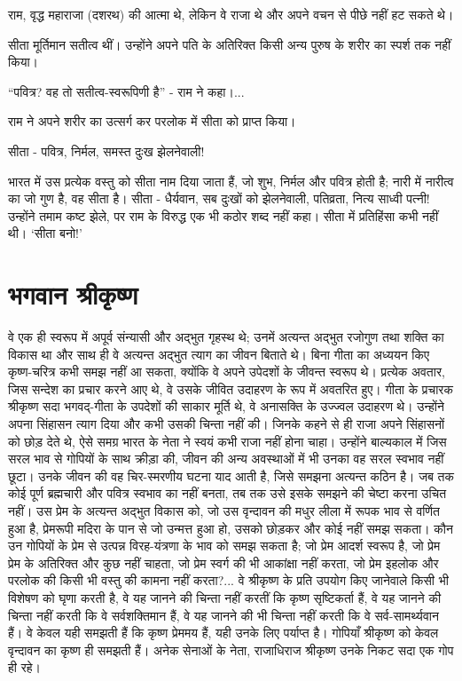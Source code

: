 राम, वृद्ध महाराजा (दशरथ) की आत्मा थे, लेकिन वे राजा थे और अपने वचन से पीछे नहीं हट सकते थे। 

सीता मूर्तिमान सतीत्व थीं। उन्होंने अपने पति के अतिरिक्त किसी अन्य पुरुष के शरीर का स्पर्श तक नहीं किया। 

\vskip 2pt

“पवित्र? वह तो सतीत्व-स्वरूपिणी है” - राम ने कहा।... 

\vskip 2pt

राम ने अपने शरीर का उत्सर्ग कर परलोक में सीता को प्राप्त किया। 

\vskip 2pt

सीता - पवित्र, निर्मल, समस्त दुःख झेलनेवाली! 

\vskip 2pt

भारत में उस प्रत्येक वस्तु को सीता नाम दिया जाता हैं, जो शुभ, निर्मल और पवित्र होती है; नारी में नारीत्व का जो गुण है, वह सीता है। सीता - धैर्यवान, सब दुःखों को झेलनेवाली, पतिव्रता, नित्य साध्वी पत्नी! उन्होंने तमाम कष्ट झेले, पर राम के विरुद्ध एक भी कठोर शब्द नहीं कहा। सीता में प्रतिहिंसा कभी नहीं थी। ‘सीता बनो!’ 

\vskip 2pt


\section*{भगवान श्रीकृष्ण}


वे एक ही स्वरूप में अपूर्व संन्यासी और अद्भुत गृहस्थ थे; उनमें अत्यन्त अद्भुत रजोगुण तथा शक्ति का विकास था और साथ ही वे अत्यन्त अद्भुत त्याग का जीवन बिताते थे। बिना गीता का अध्ययन किए कृष्ण-चरित्र कभी समझ नहीं आ सकता, क्योंकि वे अपने उपेदशों के जीवन्त स्वरूप थे। प्रत्येक अवतार, जिस सन्देश का प्रचार करने आए थे, वे उसके जीवित उदाहरण के रूप में अवतरित हुए। गीता के प्रचारक श्रीकृष्ण सदा भगवद्-गीता के उपदेशों की साकार मूर्ति थे, वे अनासक्ति के उज्ज्वल उदाहरण थे। उन्होंने अपना सिंहासन त्याग दिया और कभी उसकी चिन्ता नहीं की। जिनके कहने से ही राजा अपने सिंहासनों को छोड़ देते थे, ऐसे समग्र भारत के नेता ने स्वयं कभी राजा नहीं होना चाहा। उन्होंने बाल्यकाल में जिस सरल भाव से गोपियों के साथ क्रीड़ा की, जीवन की अन्य अवस्थाओं में भी उनका वह सरल स्वभाव नहीं छूटा। उनके जीवन की वह चिर-स्मरणीय घटना याद आती है, जिसे समझना अत्यन्त कठिन है। जब तक कोई पूर्ण ब्रह्मचारी और पवित्र स्वभाव का नहीं बनता, तब तक उसे इसके समझने की चेष्टा करना उचित नहीं। उस प्रेम के अत्यन्त अद्भुत विकास को, जो उस वृन्दावन की मधुर लीला में रूपक भाव से वर्णित हुआ है, प्रेमरूपी मदिरा के पान से जो उन्मत्त हुआ हो, उसको छोड़कर और कोई नहीं समझ सकता। कौन उन गोपियों के प्रेम से उत्पन्न विरह-यंत्रणा के भाव को समझ सकता है; जो प्रेम आदर्श स्वरूप है, जो प्रेम प्रेम के अतिरिक्त और कुछ नहीं चाहता, जो प्रेम स्वर्ग की भी आकांक्षा नहीं करता, जो प्रेम इहलोक और परलोक की किसी भी वस्तु की कामना नहीं करता?... वे श्रीकृष्ण के प्रति उपयोग किए जानेवाले किसी भी विशेषण को घृणा करती है, वे यह जानने की चिन्ता नहीं करतीं कि कृष्ण सृष्टिकर्ता हैं, वे यह जानने की चिन्ता नहीं करती कि वे सर्वशक्तिमान हैं, वे यह जानने की भी चिन्ता नहीं करती कि वे सर्व-सामर्थ्यवान हैं। वे केवल यही समझती हैं कि कृष्ण प्रेममय हैं, यही उनके लिए पर्याप्त है। गोपियाँ श्रीकृष्ण को केवल वृन्दावन का कृष्ण ही समझती हैं। अनेक सेनाओं के नेता, राजाधिराज श्रीकृष्ण उनके निकट सदा एक गोप ही रहे।

